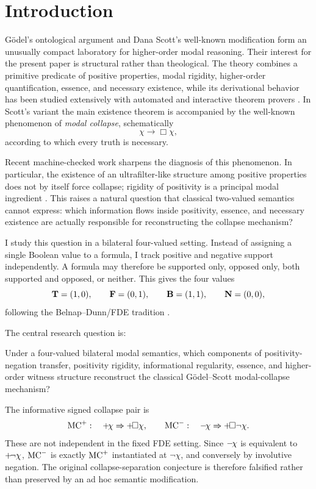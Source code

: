\section{Introduction}
\label{sec:introduction}

G\"odel's ontological argument and Dana Scott's well-known modification form an unusually compact laboratory for higher-order modal reasoning. Their interest for the present paper is structural rather than theological. The theory combines a primitive predicate of positive properties, modal rigidity, higher-order quantification, essence, and necessary existence, while its derivational behavior has been studied extensively with automated and interactive theorem provers \cite{BenzmuellerScott2025,BenzmuellerFuenmayor2019}. In Scott's variant the main existence theorem is accompanied by the well-known phenomenon of \emph{modal collapse}, schematically
\[
  \chi \rightarrow \Box\chi,
\]
according to which every truth is necessary.

Recent machine-checked work sharpens the diagnosis of this phenomenon. In particular, the existence of an ultrafilter-like structure among positive properties does not by itself force collapse; rigidity of positivity is a principal modal ingredient \cite{Benzmueller2026Collapse}. This raises a natural question that classical two-valued semantics cannot express: which information flows inside positivity, essence, and necessary existence are actually responsible for reconstructing the collapse mechanism?

I study this question in a bilateral four-valued setting. Instead of assigning a single Boolean value to a formula, I track positive and negative support independently. A formula may therefore be supported only, opposed only, both supported and opposed, or neither. This gives the four values
\[
  \mathbf{T}=(1,0),\qquad
  \mathbf{F}=(0,1),\qquad
  \mathbf{B}=(1,1),\qquad
  \mathbf{N}=(0,0),
\]
following the Belnap--Dunn/FDE tradition \cite{Belnap1977,Dunn1976}.

The central research question is:

\begin{question}
Under a four-valued bilateral modal semantics, which components of positivity-negation transfer, positivity rigidity, informational regularity, essence, and higher-order witness structure reconstruct the classical G\"odel--Scott modal-collapse mechanism?
\end{question}

The informative signed collapse pair is
\[
  \mathrm{MC}^{+}:\quad +\!\chi\Rightarrow+\!\Box\chi,
  \qquad
  \mathrm{MC}^{-}:\quad -\!\chi\Rightarrow+\!\Box\neg\chi.
\]
These are not independent in the fixed FDE setting. Since \(-\!\chi\) is equivalent to \(+\!\neg\chi\), \(\mathrm{MC}^{-}\) is exactly \(\mathrm{MC}^{+}\) instantiated at \(\neg\chi\), and conversely by involutive negation. The original collapse-separation conjecture is therefore falsified rather than preserved by an ad hoc semantic modification.


